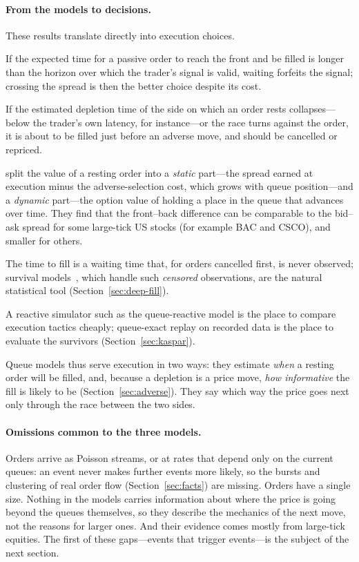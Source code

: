 \paragraph{From the models to decisions.} These results translate directly into execution choices.
\begin{description}[leftmargin=1.5em,style=nextline,itemsep=2pt]
\item[Limit or market] If the expected time for a passive order to reach the front and be filled is
  longer than the horizon over which the trader's signal is valid, waiting forfeits the signal;
  crossing the spread is then the better choice despite its cost.
\item[When to cancel] If the estimated depletion time of the side on which an order rests collapses---below
  the trader's own latency, for instance---or the race turns against the order, it is about to be filled
  just before an adverse move, and should be cancelled or repriced.
\item[Where to queue] \citet{moallemi2017} split the value of a resting order into a \emph{static}
  part---the spread earned at execution minus the adverse-selection cost, which grows with queue
  position---and a \emph{dynamic} part---the option value of holding a place in the queue that advances
  over time. They find that the front--back difference can be comparable to the bid--ask spread for some
  large-tick US stocks (for example BAC and CSCO), and smaller for others.
\item[How to estimate fill chances from data] The time to fill is a waiting time that, for orders
  cancelled first, is never observed; survival models~\citep{cox1972}, which handle such \emph{censored}
  observations, are the natural statistical tool (Section~\ref{sec:deep-fill}).
\item[How to test tactics] A reactive simulator such as the queue-reactive model is the place to compare
  execution tactics cheaply; queue-exact replay on recorded data is the place to evaluate the survivors
  (Section~\ref{sec:kaspar}).
\end{description}
Queue models thus serve execution in two ways: they estimate \emph{when} a resting order will be filled,
and, because a depletion is a price move, \emph{how informative} the fill is likely to be
(Section~\ref{sec:adverse}). They say which way the price goes next only through the race between the two
sides.

\paragraph{Omissions common to the three models.} Orders arrive as Poisson streams, or at rates that depend only on
the current queues: an event never makes further events more likely, so the bursts and clustering of real
order flow (Section~\ref{sec:facts}) are missing. Orders have a single size. Nothing in the models carries
information about where the price is going beyond the queues themselves, so they describe the mechanics of
the next move, not the reasons for larger ones. And their evidence comes mostly from large-tick equities.
The first of these gaps---events that trigger events---is the subject of the next section.

